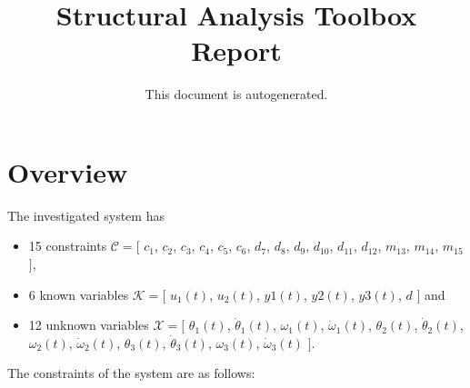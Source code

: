 \documentclass[a4,11pt]{article}
\title{Structural Analysis Toolbox Report}
\author{This document is autogenerated.}
\begin{document}
\maketitle
\section{Overview}
The investigated system has
\begin{itemize}
	\item 15 constraints $\mathcal{C} = [$ $c_1$, $c_2$, $c_3$, $c_4$, $c_5$, $c_6$, $d_7$, $d_8$, $d_9$, $d_{10}$, $d_{11}$, $d_{12}$, $m_{13}$, $m_{14}$, $m_{15}$ $]$,
	\item 6 known variables $\mathcal{K} = [$ $u_1\left(t\right)$, $u_2\left(t\right)$, $y1\left(t\right)$, $y2\left(t\right)$, $y3\left(t\right)$, $d$ $]$ and
	\item 12 unknown variables $\mathcal{X} = [$ $\theta_1\left(t\right)$, $\dot{\theta}_1\left(t\right)$, $\omega_1\left(t\right)$, $\dot{\omega}_1\left(t\right)$, $\theta_2\left(t\right)$, $\dot{\theta}_2\left(t\right)$, $\omega_2\left(t\right)$, $\dot{\omega}_2\left(t\right)$, $\theta_3\left(t\right)$, $\dot{\theta}_3\left(t\right)$, $\omega_3\left(t\right)$, $\dot{\omega}_3\left(t\right)$ $]$.
\end{itemize}
The constraints of the system are as follows:
\end{document}
